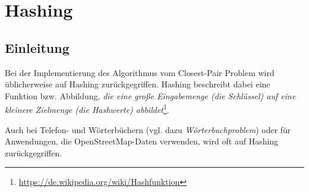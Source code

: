 \documentclass{scrartcl}%
\begin{document}

    \section*{Hashing}\label{sec:hashing}
    \subsection*{Einleitung}\label{subsec:einleitung}
    Bei der Implementierung des Algorithmus vom Closest-Pair Problem wird üblicherweise auf Hashing zurückgegriffen.
    Hashing beschreibt dabei eine Funktion bzw. Abbildung, \textit{die eine große Eingabemenge (die Schlüssel)
    auf eine kleinere Zielmenge (die Hashwerte) abbildet}\footnote{\url{https://de.wikipedia.org/wiki/Hashfunktion}}.

    Auch bei Telefon- und Wörterbüchern (vgl. dazu \textit{Wörterbuchproblem}) oder für Anwendungen,
    die OpenStreetMap-Daten verwenden, wird oft auf Hashing zurückgegriffen.

    \begin{figure}[H]
        \centering
    \end{figure}
\end{document}
